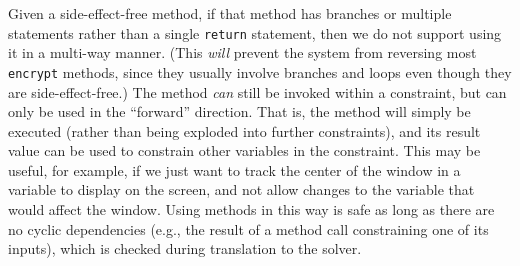 \documentclass[10pt,reprint]{sigplanconf-preprint}
\def\tdm#1{\todo[size=\footnotesize,color=blue!40]{\textsf{TDM: #1}}}
\def\ab#1{\todo[size=\footnotesize,color=red!40]{\textsf{AB: #1}}}
\def\tf#1{\todo[size=\footnotesize,color=purple!40]{\textsf{TF: #1}}}
\newcommand\hairspace{\ifmmode\mskip1mu\else\kern0.08em\fi}
\newcommand{\ie}{i.\hairspace{}e.,\xspace}
\begin{document}
Given a side-effect-free method, if that method has branches or
multiple statements rather than a single {\tt return} statement, then
we do not support using it in a multi-way manner. (This \emph{will}
prevent the system from reversing most \verb!encrypt! methods, since they
usually involve branches and loops even though they are side-effect-free.)
The method \emph{can} still be invoked within a constraint,
but can only be used in the ``forward''
direction.  That is, the method will simply be executed (rather than 
being exploded into further constraints), and its
result value can be used to constrain other variables in the
constraint. This may be useful, for example, if we just want to track the 
center of the window in a variable to display on the screen, and not allow
changes to the variable that would affect the window.
Using methods in this way is safe as long as there are 
no cyclic dependencies (e.g., the
result of a method call constraining one of its inputs), which is
checked during translation to the solver. %
\end{document}
